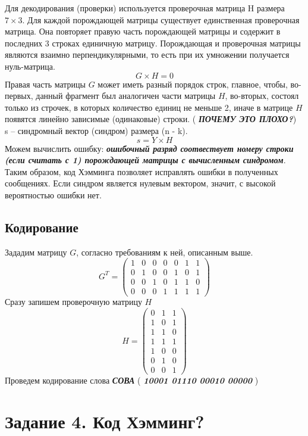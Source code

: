 \documentclass[a5paper, 10pt]{article}
\theoremstyle{definition}
\theoremstyle{plain}
\theoremstyle{remark}
\begin{document}
Для декодирования (проверки) используется проверочная матрица H размера $7 \times 3$. Для каждой порождающей матрицы существует единственная проверочная матрица. Она повторяет правую часть порождающей матрицы и содержит в последних 3 строках единичную матрицу. Порождающая и проверочная матрицы являются взаимно перпендикулярными, то есть при их умножении получается нуль-матрица.
\begin{equation}
G \times H  = 0
\end{equation}
Правая часть матрицы $G$ может иметь разный порядок строк, главное, чтобы, во-первых, данный фрагмент был аналогичен части матрицы $H$, во-вторых, состоял только из строчек, в которых количество единиц не меньше 2, иначе в матрице $H$ появятся линейно зависимые (одинаковые) строки. ( \textbf{\textit{ПОЧЕМУ ЭТО ПЛОХО?}})\\
s -- синдромный вектор (синдром) размера (n - k).
\begin{equation}
s = Y \times H
\end{equation}
Можем вычислить ошибку:  \textbf{\textit{ошибочный разряд соотвествует номеру строки (если считать с 1) порождающей матрицы с вычисленным синдромом}}. Таким образом, код Хэмминга позволяет исправлять ошибки в полученных сообщениях. Если синдром является нулевым вектором, значит, с высокой вероятностью ошибки нет.

\subsection{Кодирование}
Зададим матрицу $G$, согласно требованиям к ней, описанным выше.
\begin{equation}
G^{T} = 
\begin{pmatrix}
1 & 0 & 0 & 0 & 0 & 1 & 1\\
0 & 1 & 0 & 0 & 1 & 0 & 1\\
0 & 0 & 1 & 0 & 1 & 1 & 0\\
0 & 0 & 0 & 1 & 1 & 1 & 1
\end{pmatrix}
\end{equation}
Сразу запишем проверочную матрицу $H$
\begin{equation}
H = 
\begin{pmatrix}
 0 & 1 & 1\\
 1 & 0 & 1\\
 1 & 1 & 0\\
 1 & 1 & 1 \\
1 & 0 & 0\\
0 & 1 & 0 \\
0 & 0 & 1
\end{pmatrix}
\end{equation}
Проведем кодирование слова \textbf{\textit{СОВА}} (  \textbf{\textit{10001 01110 00010 00000}} )

\section{Задание 4. Код Хэмминг?}
\end{document}
